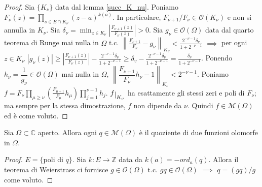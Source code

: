 \begin{proof}
  Sia $\{K_{\nu}\}$ data dal lemma \ref{succ_K_nu}. Poniamo $\displaystyle F_{\nu}(z)=\prod_{s \in E \cap K_{\nu}} (z-a)^{k(a)}$. In particolare, $F_{\nu+1}/F_{\nu} \in \mathcal{O}(K_{\nu})$ e non si annulla in $K_{\nu}$.
  Sia $\displaystyle \delta_{\nu}=\min_{z \in K_{\nu}} \left|\frac{F_{\nu+1}(z)}{F_{\nu}(z)}\right|>0$.
  Sia $g_{\nu} \in \mathcal{O}(\Omega)$ data dal quarto teorema di Runge mai nulla in $\Omega$ t.c. $\displaystyle \left\|\frac{F_{\nu+1}}{F_{\nu}}-g_{\nu}\right\|_{K_{\nu}}<\frac{2^{-\nu-1}\delta_{\nu}}{1+2^{-\nu-1}}$
  $\implies$ per ogni $z \in K_{\nu}$ $\displaystyle |g_{\nu}(z)| \ge \left|\frac{F_{\nu+1}(z)}{F_{\nu}(z)}\right|-\frac{2^{-\nu-1}\delta_{\nu}}{1+2^{-\nu-1}} \ge \delta_v-\frac{2^{-\nu-1}\delta_{\nu}}{1+2^{-\nu-1}}=\frac{\delta_{\nu}}{1+2^{-\nu-1}}$.
  Ponendo $h_{\nu}=\dfrac{1}{g_{\nu}} \in \mathcal{O}(\Omega)$ mai nulla in $\Omega$, $\left \|\dfrac{F_{\nu+1}}{F_{\nu}}h_{\nu}-1\right\|_{K_{\nu}}<2^{-\nu-1}$.
  Poniamo $\displaystyle f=F_{\nu}\prod_{\mu\ge\nu}\left(\frac{F_{\mu+1}}{F_{\mu}}h_{\mu}\right) \prod_{j=1}^{\nu-1}h_j$. $f\restrict{K_{\nu}}$ ha esattamente gli stessi zeri e poli di $F_{\nu}$; ma sempre per la stessa dimostrazione, $f$ non dipende da $\nu$. Quindi $f \in \mathcal{M}(\Omega)$ ed è come voluto.
\end{proof}

\begin{cor}
  Sia $\Omega \subset \mathbb{C}$ aperto. Allora ogni $q \in \mathcal{M}(\Omega)$ è il quoziente di due funzioni olomorfe in $\Omega$.
\end{cor}

\begin{proof}
  $E=\{$poli di $q\}$. Sia $k:E \longrightarrow \mathbb{Z}$ data da $k(a)=-ord_a(q)$. Allora il teorema di Weierstrass ci fornisce $g \in \mathcal{O}(\Omega)$ t.c. $gq \in \mathcal{O}(\Omega)$ $\implies$ $q=(gq)/g$ come voluto.
\end{proof}
